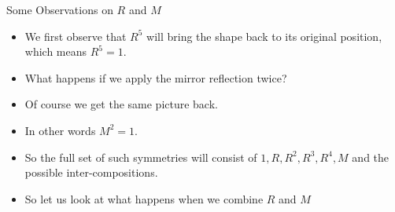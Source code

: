 \documentclass[ %
 10pt, xcolor={dvipsnames,svgnames,x11names,hyperref},
   hyperref={colorlinks=true,citecolor=green,linkcolor=DarkRed,urlcolor=ProcessBlue,anchorcolor=blue}
  ]{beamer}
\newenvironment{stepitemize}{\begin{itemize}[<+->]}{\end{itemize} }
\begin{document}
\begin{frame}{Some Observations on $R$ and $M$}
\begin{stepitemize}
\item We first observe that $R^5$ will bring the shape back to its original position, which means $R^5=1$.
\item What happens if we apply the mirror reflection twice? 
\item Of course we get the same picture back.
\item In other words $M^2=1$.
\item So the full set of such symmetries will consist of 
$1, R, R^2, R^3, R^4, M$ and the possible inter-compositions. 
\item So let us look at what happens when we combine $R$ and $M$
\end{stepitemize}
\end{frame}
\end{document}
